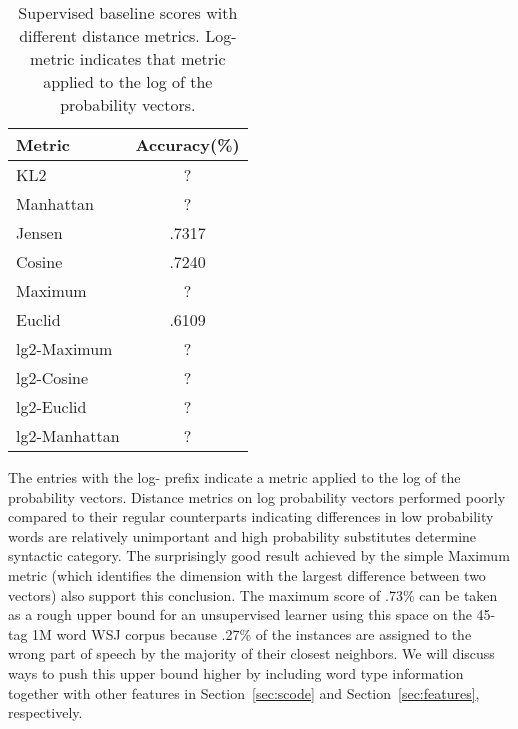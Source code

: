\begin{table}[ht] \centering
\begin{tabular}{|l|c|}
\hline
Metric & Accuracy(\%) \\
\hline
KL2 & ? \\
Manhattan & ? \\
Jensen & .7317 \\ %
Cosine & .7240 \\ %
Maximum & ? \\
Euclid & .6109 \\ %
lg2-Maximum & ? \\
lg2-Cosine & ? \\
lg2-Euclid & ? \\
lg2-Manhattan & ? \\
\hline
\end{tabular}
\caption{Supervised baseline scores with different distance metrics.
  Log-metric indicates that metric applied to the log of the
  probability vectors.}
\label{tab:distscores}
\end{table}



The entries with the log- prefix indicate a metric applied to the log
of the probability vectors.  Distance metrics on log probability
vectors performed poorly compared to their regular counterparts
indicating differences in low probability words are relatively
unimportant and high probability substitutes determine syntactic
category.  The surprisingly good result achieved by the simple Maximum
metric (which identifies the dimension with the largest difference
between two vectors) also support this conclusion.  The maximum score
of .73\% can be taken as a rough upper bound for an unsupervised
learner using this space on the 45-tag 1M word WSJ corpus because
.27\% of the instances are assigned to the wrong part of speech by the
majority of their closest neighbors.  We will discuss ways to push
this upper bound higher by including word type information together
with other features in Section~\ref{sec:scode} and
Section~\ref{sec:features}, respectively.



